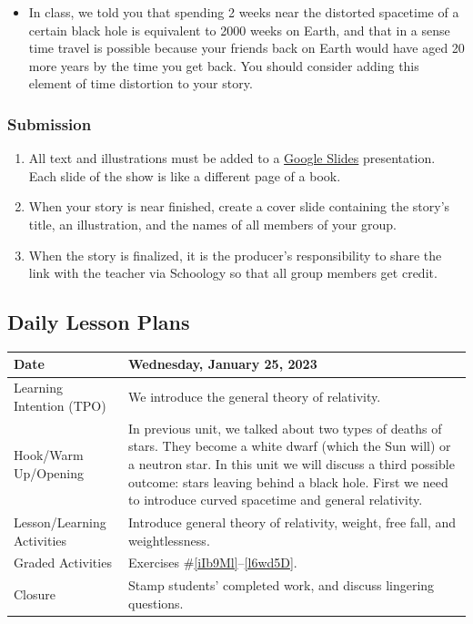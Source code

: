 \documentclass{article}
\numberwithin{equation}{section}
\numberwithin{figure}{section}
\begin{document}
\begin{itemize}
\setlength\itemsep{-1ex}
    \item In class, we told you that spending 2 weeks near the distorted spacetime of a certain black hole is equivalent to 2000 weeks on Earth, and that in a sense time travel is possible because your friends back on Earth would have aged 20 more years by the time you get back. You should consider adding this element of time distortion to your story.
\end{itemize}

\subsubsection*{Submission}

\begin{enumerate}
\setlength\itemsep{-1ex}
    \item All text and illustrations must be added to a \href{https://docs.google.com/presentation/}{Google Slides} presentation. Each slide of the show is like a different page of a book.
    \item When your story is near finished, create a cover slide containing the story's title, an illustration, and the names of all members of your group.
    \item When the story is finalized, it is the producer's responsibility to share the link with the teacher via Schoology so that all group members get credit.
\end{enumerate}







\clearpage
\printnoidxglossaries

\clearpage
\subsection*{Daily Lesson Plans}

\begin{tabular}{|m{}|m{}|}
    \hline  
    \cellcolor{black!20}\textbf{Date} &
    \cellcolor{black!20}\textbf{Wednesday, January 25, 2023} \\
    \hline
    Learning Intention (TPO) & We introduce the \gls{general theory of relativity}. \\
    \hline
    Hook/Warm Up/Opening & In previous unit, we talked about two types of deaths of stars. They become a white dwarf (which the Sun will) or a neutron star. In this unit we will discuss a third possible outcome: stars leaving behind a black hole. First we need to introduce curved spacetime and general relativity.\\
    \hline
    Lesson/Learning Activities & Introduce \gls{general theory of relativity}, \gls{weight}, \gls{free fall}, and \gls{weightlessness}.\\
    \hline
    Graded Activities & Exercises \#\ref{iIb9Ml}--\ref{l6wd5D}.\\
    \hline
    Closure & Stamp students' completed work, and discuss lingering questions.\\  
    \hline
\end{tabular}  
\end{document}
